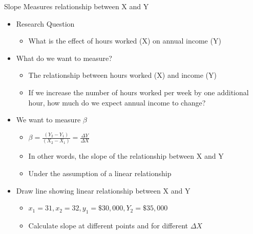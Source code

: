 \documentclass[
  8pt,
  ignorenonframetext,
  dvipsnames]{beamer}
\providecommand{\tightlist}{%
  \setlength{\itemsep}{0pt}\setlength{\parskip}{0pt}}
\let\olditem\item
\renewcommand{\item}{%
  \olditem\vspace{4pt}
}
\begin{document}
\begin{frame}{Slope Measures relationship between X and Y}
\protect\hypertarget{slope-measures-relationship-between-x-and-y}{}

\begin{itemize}
\tightlist
\item
  Research Question

  \begin{itemize}
  \tightlist
  \item
    What is the effect of hours worked (X) on annual income (Y)
  \end{itemize}
\end{itemize}

\medskip

\begin{itemize}
\tightlist
\item
  What do we want to measure?

  \begin{itemize}
  \tightlist
  \item
    The relationship between hours worked (X) and income (Y)
  \item
    If we increase the number of hours worked per week by one additional
    hour, how much do we expect annual income to change?
  \end{itemize}
\end{itemize}

\medskip

\begin{itemize}
\tightlist
\item
  We want to measure \(\beta\)

  \begin{itemize}
  \tightlist
  \item
    \(\beta = \frac{(Y_2 - Y_1)}{(X_2 - X_1)} = \frac{\Delta Y}{\Delta X}\)
  \item
    In other words, the slope of the relationship between X and Y
  \item
    Under the assumption of a linear relationship
  \end{itemize}
\end{itemize}

\medskip

\begin{itemize}
\tightlist
\item
  Draw line showing linear relationship between X and Y

  \begin{itemize}
  \tightlist
  \item
    \(x_1 = 31, x_2 =32, y_1=\$30,000, Y_2=\$35,000\)
  \item
    Calculate slope at different points and for different \(\Delta X\)
  \end{itemize}
\end{itemize}

\end{frame}
\end{document}
